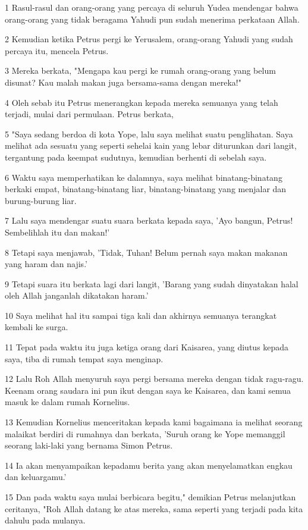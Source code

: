 \par 1 Rasul-rasul dan orang-orang yang percaya di seluruh Yudea mendengar bahwa orang-orang yang tidak beragama Yahudi pun sudah menerima perkataan Allah.
\par 2 Kemudian ketika Petrus pergi ke Yerusalem, orang-orang Yahudi yang sudah percaya itu, mencela Petrus.
\par 3 Mereka berkata, "Mengapa kau pergi ke rumah orang-orang yang belum disunat? Kau malah makan juga bersama-sama dengan mereka!"
\par 4 Oleh sebab itu Petrus menerangkan kepada mereka semuanya yang telah terjadi, mulai dari permulaan. Petrus berkata,
\par 5 "Saya sedang berdoa di kota Yope, lalu saya melihat suatu penglihatan. Saya melihat ada sesuatu yang seperti sehelai kain yang lebar diturunkan dari langit, tergantung pada keempat sudutnya, kemudian berhenti di sebelah saya.
\par 6 Waktu saya memperhatikan ke dalamnya, saya melihat binatang-binatang berkaki empat, binatang-binatang liar, binatang-binatang yang menjalar dan burung-burung liar.
\par 7 Lalu saya mendengar suatu suara berkata kepada saya, 'Ayo bangun, Petrus! Sembelihlah itu dan makan!'
\par 8 Tetapi saya menjawab, 'Tidak, Tuhan! Belum pernah saya makan makanan yang haram dan najis.'
\par 9 Tetapi suara itu berkata lagi dari langit, 'Barang yang sudah dinyatakan halal oleh Allah janganlah dikatakan haram.'
\par 10 Saya melihat hal itu sampai tiga kali dan akhirnya semuanya terangkat kembali ke surga.
\par 11 Tepat pada waktu itu juga ketiga orang dari Kaisarea, yang diutus kepada saya, tiba di rumah tempat saya menginap.
\par 12 Lalu Roh Allah menyuruh saya pergi bersama mereka dengan tidak ragu-ragu. Keenam orang saudara ini pun ikut dengan saya ke Kaisarea, dan kami semua masuk ke dalam rumah Kornelius.
\par 13 Kemudian Kornelius menceritakan kepada kami bagaimana ia melihat seorang malaikat berdiri di rumahnya dan berkata, 'Suruh orang ke Yope memanggil seorang laki-laki yang bernama Simon Petrus.
\par 14 Ia akan menyampaikan kepadamu berita yang akan menyelamatkan engkau dan keluargamu.'
\par 15 Dan pada waktu saya mulai berbicara begitu," demikian Petrus melanjutkan ceritanya, "Roh Allah datang ke atas mereka, sama seperti yang terjadi pada kita dahulu pada mulanya.
